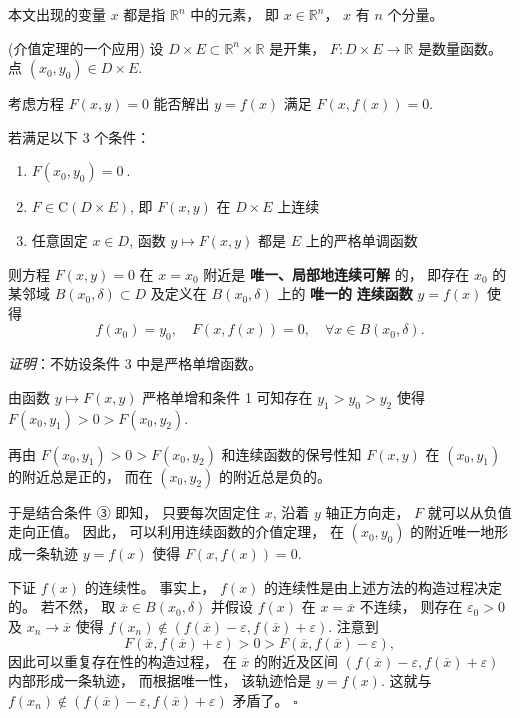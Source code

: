 

本文出现的变量 $x$ 都是指 $\mathbb{R}^n$ 中的元素， 即 $x\in\mathbb{R}^n$， $x$ 有 $n$ 个分量。

\begin{theorem}{(介值定理的一个应用)}\label{the_impli_1}
设 $D\times E\subset\mathbb{R}^{n}\times\mathbb{R}$ 是开集，
$F:D\times E\rightarrow\mathbb{R}$ 是数量函数。 点 $(x_{0},y_{0})\in D\times E.$ 

考虑方程 $F(x,y)=0$ 能否解出 $y=f(x)$ 满足 $F(x,f(x))=0.$ 

若满足以下 3 个条件：

\begin{enumerate}
\item $F(x_{0},y_{0})=0~.$
\item $F\in\mathrm{C}(D\times E)$, 即 $F(x,y)$ 在 $D\times E$ 上连续
\item 任意固定 $x\in D$, 函数 $y\mapsto F(x,y)$ 都是 $E$ 上的严格单调函数
\end{enumerate}

则方程 $F(x,y)=0$ 在 $x=x_{0}$ 附近是\textbf{ 唯一、局部地连续可解} 的， 即存在 $x_{0}$
的某邻域 $B(x_{0},\delta)\subset D$ 及定义在 $B(x_{0},\delta)$ 上的 \textbf{唯一的}\textbf{
连续函数} $y=f(x)$ 使得
\[
f(x_{0})=y_{0},\quad F(x,f(x))=0,\quad\forall x\in B(x_{0},\delta).
\]
\end{theorem}

\textsl{证明}：不妨设条件 3 中是严格单增函数。 

由函数 $y\mapsto F(x,y)$ 严格单增和条件 1 可知存在 $y_{1}>y_{0}>y_{2}$ 使得 $F(x_{0},y_{1})>0>F(x_{0},y_{2})$. 

再由 $F(x_{0},y_{1})>0>F(x_{0},y_{2})$ 和连续函数的保号性知 $F(x,y)$ 在 $(x_{0},y_{1})$
的附近总是正的， 而在 $(x_{0},y_{2})$ 的附近总是负的。 

于是结合条件 ③ 即知， 只要每次固定住 $x$, 沿着 $y$ 轴正方向走， $F$ 就可以从负值走向正值。 因此， 可以利用连续函数的介值定理，
在 $(x_{0},y_{0})$ 的附近唯一地形成一条轨迹 $y=f(x)$ 使得 $F(x,f(x))=0$. 

下证 $f(x)$ 的连续性。 事实上， $f(x)$ 的连续性是由上述方法的构造过程决定的。 若不然， 取 $\overline{x}\in B(x_0,\delta)$ 并假设 $f(x)$ 在
$x=\overline{x}$ 不连续， 则存在 $\varepsilon_{0}>0$ 及 $x_{n}\rightarrow\overline{x}$
使得 $f(x_{n})\notin(f(\overline{x})-\varepsilon,f(\overline{x})+\varepsilon)$.
注意到
\[
F(\overline{x},f(\overline{x})+\varepsilon)>0>F(\overline{x},f(\overline{x})-\varepsilon),
\]
因此可以重复存在性的构造过程， 在 \textbf{$\overline{x}$ }的附近及区间 $(f(\overline{x})-\varepsilon,f(\overline{x})+\varepsilon)$
内部形成一条轨迹， 而根据唯一性， 该轨迹恰是 $y=f(x)$. 这就与 $f(x_{n})\notin(f(\overline{x})-\varepsilon,f(\overline{x})+\varepsilon)$
矛盾了。 $\square$ 

